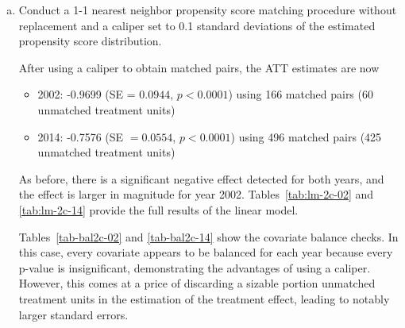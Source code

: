 \begin{enumerate}[(a)]
\item
  \begin{quoting}
    Conduct a 1-1 nearest neighbor propensity score matching procedure
    without replacement and a caliper set to 0.1 standard deviations
    of the estimated propensity score distribution.
  \end{quoting}
  After using a caliper to obtain matched pairs, the ATT estimates are
  now
  \begin{itemize}
  \item 2002: -0.9699 (SE = $0.0944$, $p < 0.0001$) using 166 matched
    pairs (60 unmatched treatment units)
  \item 2014: -0.7576 (SE $= 0.0554$, $p < 0.0001$) using 496 matched
    pairs (425 unmatched treatment units)
  \end{itemize}
  As before, there is a significant negative effect detected for both
  years, and the effect is larger in magnitude for year 2002.
  Tables~\ref{tab:lm-2c-02} and \ref{tab:lm-2c-14} provide the full
  results of the linear model.

  Tables~\ref{tab-bal2c-02} and \ref{tab-bal2c-14} show the covariate
  balance checks.  In this case, every covariate appears to be
  balanced for each year because every p-value is insignificant,
  demonstrating the advantages of using a caliper.  However, this
  comes at a price of discarding a sizable portion unmatched treatment
  units in the estimation of the treatment effect, leading to notably
  larger standard errors.

  



\end{enumerate}
